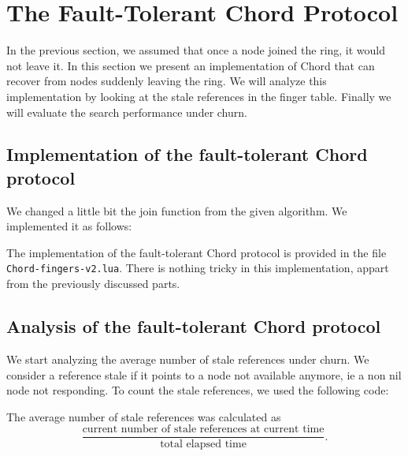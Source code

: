 \documentclass[a4paper, 11pt]{article}
\theoremstyle{plain}
\theoremstyle{definition}
\begin{document}
\section{The Fault-Tolerant Chord Protocol}
\label{sec:fault-tolerant-chord}

  In the previous section, we assumed that once a node joined the ring, it would not leave it. In this section
  we present an implementation of Chord that can recover from nodes suddenly leaving the ring. We will analyze
  this implementation by looking at the stale references in the finger table. Finally we will evaluate the
  search performance under churn.

  \subsection{Implementation of the fault-tolerant Chord protocol}
  \label{sec:impl-ft-chord}
  
    We changed a little bit the join function from the given algorithm. We implemented it as follows:

    

    The implementation of the fault-tolerant Chord protocol is provided in the file
    \texttt{Chord-fingers-v2.lua}. There is nothing tricky in this implementation, appart from the previously
    discussed parts. 
    
    
  \subsection{Analysis of the fault-tolerant Chord protocol}
  \label{sec:eval-ft-chord}

    We start analyzing the average number of stale references under churn. We consider a reference stale if it
    points to a node not available anymore, ie a non nil node not responding. To count the stale references,
    we used the following code:

    

    The average number of stale references was calculated as
      \[\frac{\text{current number of stale
          references at current time}}{\text{total elapsed time}}.\]
    
\end{document}
